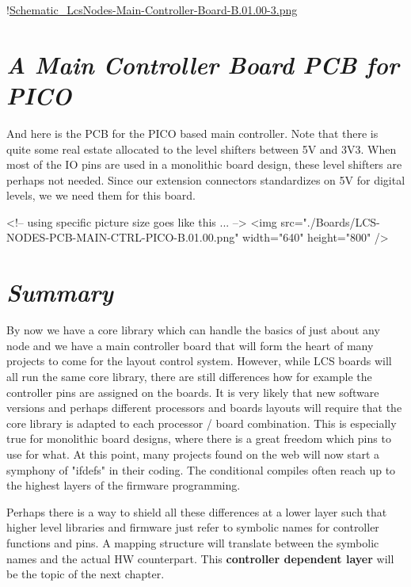 !\href{./Schematics/Schematic_LcsNodes-Main-Controller-Board-B.01.00-3.png }{Schematic_LcsNodes-Main-Controller-Board-B.01.00-3.png}

\section{\textit{A Main Controller Board PCB for PICO}}

And here is the PCB for the PICO based main controller. Note that there is quite some real estate allocated to the level shifters between 5V and 3V3. When most of the IO pins are used in a monolithic board design, these level shifters are perhaps not needed. Since our extension connectors standardizes on 5V for digital levels, we we need them for this board.

<!-- using specific picture size goes like this ... -->
<img src="./Boards/LCS-NODES-PCB-MAIN-CTRL-PICO-B.01.00.png" width="640" height="800" />


\section{\textit{Summary}}

By now we have a core library which can handle the basics of just about any node and we have a main controller board that will form the heart of many projects to come for the layout control system. However, while LCS boards will all run the same core library, there are still differences how for example the controller pins are assigned on the boards. It is very likely that new software versions and perhaps different processors and boards layouts will require that the core library is adapted to each processor / board combination. This is especially true for monolithic board designs, where there is a great freedom which pins to use for what. At this point, many projects found on the web will now start a symphony of "ifdefs" in their coding. The conditional compiles often reach up to the highest layers of the firmware programming. 

Perhaps there is a way to shield all these differences at a lower layer such that higher level libraries and firmware just refer to symbolic names for controller functions and pins. A mapping structure will translate between the symbolic names and the actual HW counterpart. This \textbf{controller dependent layer} will be the topic of the next chapter.
